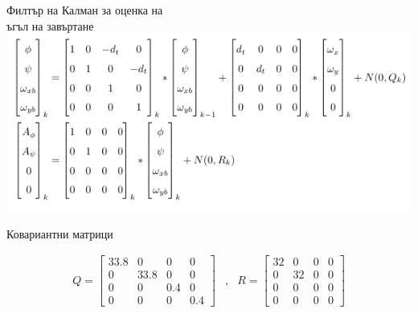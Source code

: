 \documentclass[handout]{beamer}
\begin{document}
\begin{frame}{Филтър на Калман за оценка на \\ъгъл на завъртане}
	\includegraphics[width=\textwidth]{Images/kf.png}
\end{frame}
\begin{frame}{Ковариантни матрици}

\begin{align*}
    Q =
    \begin{bmatrix}
        33.8 & 0 & 0 & 0 \\
        0 & 33.8 & 0 & 0 \\
        0 & 0 & 0.4 & 0 \\
        0 & 0 & 0 & 0.4
    \end{bmatrix} &,&
    R = \begin{bmatrix}
        32 & 0 & 0 & 0 \\
        0 & 32 & 0 & 0 \\
        0 & 0 & 0 & 0 \\
        0 & 0 & 0 & 0
    \end{bmatrix}
\end{align*}
\end{frame}
\end{document}
